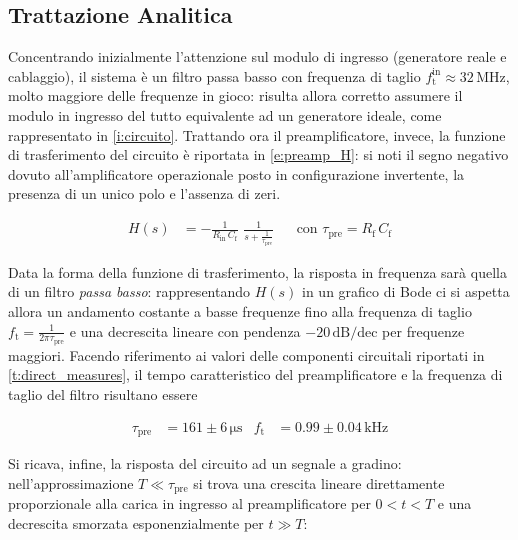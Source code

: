 \documentclass[a4paper,11pt]{article} %
\begin{document}

\subsection{Trattazione Analitica}\label{s:preamp_th} 

Concentrando inizialmente l'attenzione sul modulo di ingresso (generatore reale e cablaggio), il sistema è un filtro
passa basso con frequenza di taglio $f_{\text{t}}^{\text{in}}\approx 32 \,\si{\MHz}$, molto maggiore delle frequenze in
gioco: risulta allora corretto assumere il modulo in ingresso del tutto equivalente ad un generatore ideale, come
rappresentato in \autoref{i:circuito}. Trattando ora il preamplificatore, invece, la funzione di trasferimento del
circuito è riportata in \autoref{e:preamp_H}: si noti il segno negativo dovuto all'amplificatore operazionale posto in
configurazione invertente, la presenza di un unico polo e l'assenza di zeri. 

\begin{align}\label{e:preamp_H} 
	H(s) &= - \frac{ 1 }{ R_{\text{in}}\,C_{\text{f}} } \,\, \frac{1}{ s + \frac{1}{\tau_{\text{pre}} } } 
	& 
	&\text{con} \,\, \tau_{\text{pre}} = R_{\text{f}}\,C_{\text{f}}
\end{align} 

Data la forma della funzione di trasferimento, la risposta in frequenza sarà quella di un filtro \textit{passa basso}:
rappresentando $H(s)$ in un grafico di Bode ci si aspetta allora un andamento costante a basse frequenze fino alla
frequenza di taglio $f_{\text{t}}=\frac{1}{2\pi\tau_{\text{pre}}}$ e una decrescita lineare con pendenza
$-20\,\text{dB/dec}$ per frequenze maggiori. Facendo riferimento ai valori delle componenti circuitali riportati in
\autoref{t:direct_measures}, il tempo caratteristico del preamplificatore e la frequenza di taglio del filtro risultano
essere

\begin{align}\label{e:preamp_stime_th}
	\tau_{\text{pre}} & = 161 \pm 6 \,\si{\us}
	&
	f_{\text{t}} & = 0.99 \pm 0.04 \,\si{\kilo\Hz}
\end{align}

Si ricava, infine, la risposta del circuito ad un segnale a gradino: nell'approssimazione $T\ll\tau_{\text{pre}}$ si trova
una crescita lineare direttamente proporzionale alla carica in ingresso al preamplificatore per $0 < t < T$ e una
decrescita smorzata esponenzialmente per $t \gg T$:
\end{document}
